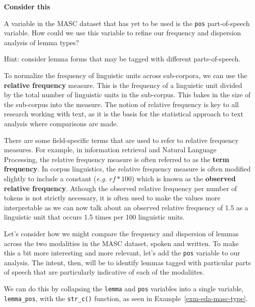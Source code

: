 \documentclass[
  letterpaper,
  DIV=11,
  numbers=noendperiod]{scrreport}
\theoremstyle{definition}
\theoremstyle{remark}
\begin{document}
\begin{tcolorbox}[enhanced jigsaw, breakable, colback=white, rightrule=.15mm, arc=.35mm, left=2mm, toprule=.15mm, leftrule=.75mm, bottomrule=.15mm, opacityback=0]

\textbf{ Consider this}

A variable in the MASC dataset that has yet to be used is the
\texttt{pos} part-of-speech variable. How could we use this variable to
refine our frequency and dispersion analysis of lemma types?

Hint: consider lemma forms that may be tagged with different
parts-of-speech.

\end{tcolorbox}

To normalize the frequency of linguistic units across sub-corpora, we
can use the \textbf{relative frequency} measure. This is the frequency
of a linguistic unit divided by the total number of linguistic units in
the sub-corpus. This bakes in the size of the sub-corpus into the
measure. The notion of relative frequency is key to all research working
with text, as it is the basis for the statistical approach to text
analysis where comparisons are made.

There are some field-specific terms that are used to refer to relative
frequency measures. For example, in information retrieval and Natural
Language Processing, the relative frequency measure is often referred to
as the \textbf{term frequency}. In corpus linguistics, the relative
frequency measure is often modified slightly to include a constant
(\emph{e.g.} \(rf * 100\)) which is known as the \textbf{observed
relative frequency}. Athough the observed relative frequency per number
of tokens is not strictly necessary, it is often used to make the values
more interpretable as we can now talk about an observed relative
frequency of 1.5 as a linguistic unit that occurs 1.5 times per 100
linguistic units.

Let's consider how we might compare the frequency and dispersion of
lemmas across the two modalities in the MASC dataset, spoken and
written. To make this a bit more interesting and more relevant, let's
add the \texttt{pos} variable to our analysis. The intent, then, will be
to identify lemmas tagged with particular parts of speech that are
particularly indicative of each of the modaliites.

We can do this by collapsing the \texttt{lemma} and \texttt{pos}
variables into a single variable, \texttt{lemma\_pos}, with the
\texttt{str\_c()} function, as seen in Example~\ref{exm-eda-masc-type}.
\end{document}

